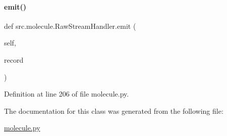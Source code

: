 \paragraph{\texorpdfstring{emit()}{emit()}}
{\footnotesize\ttfamily def src.\+molecule.\+Raw\+Stream\+Handler.\+emit (\begin{DoxyParamCaption}\item[{}]{self,  }\item[{}]{record }\end{DoxyParamCaption})}



Definition at line 206 of file molecule.\+py.



The documentation for this class was generated from the following file\+:\begin{DoxyCompactItemize}
\item 
\hyperlink{molecule_8py}{molecule.\+py}\end{DoxyCompactItemize}
